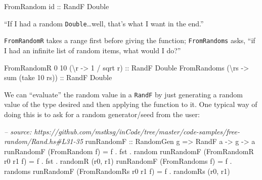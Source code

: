 \documentclass[]{article}
\newenvironment{Shaded}{}{}
\newcommand{\DataTypeTok}[1]{\textcolor[rgb]{0.56,0.13,0.00}{{#1}}}
\newcommand{\DecValTok}[1]{\textcolor[rgb]{0.25,0.63,0.44}{{#1}}}
\newcommand{\CommentTok}[1]{\textcolor[rgb]{0.38,0.63,0.69}{\textit{{#1}}}}
\newcommand{\OtherTok}[1]{\textcolor[rgb]{0.00,0.44,0.13}{{#1}}}
\newcommand{\FunctionTok}[1]{\textcolor[rgb]{0.02,0.16,0.49}{{#1}}}
\newcommand{\NormalTok}[1]{{#1}}
\begin{document}
\begin{Shaded}
\begin{Highlighting}[]
\DataTypeTok{FromRandom}\OtherTok{ id ::} \DataTypeTok{RandF} \DataTypeTok{Double}
\end{Highlighting}
\end{Shaded}

``If I had a random \texttt{Double}\ldots{}well, that's what I want in
the end.''

\texttt{FromRandomR} takes a range first before giving the function;
\texttt{FromRandoms} asks, ``if I had an infinite list of random items,
what would I do?''

\begin{Shaded}
\begin{Highlighting}[]
\DataTypeTok{FromRandomR} \DecValTok{0} \DecValTok{10} \NormalTok{(\textbackslash{}r }\OtherTok{->} \DecValTok{1} \FunctionTok{/} \NormalTok{sqrt r)}\OtherTok{ ::} \DataTypeTok{RandF} \DataTypeTok{Double}
\DataTypeTok{FromRandoms} \NormalTok{(\textbackslash{}rs }\OtherTok{->} \NormalTok{sum (take }\DecValTok{10} \NormalTok{rs))}\OtherTok{ ::} \DataTypeTok{RandF} \DataTypeTok{Double}
\end{Highlighting}
\end{Shaded}

We can ``evaluate'' the random value in a \texttt{RandF} by just
generating a random value of the type desired and then applying the
function to it. One typical way of doing this is to ask for a random
generator/seed from the user:

\begin{Shaded}
\begin{Highlighting}[]
\CommentTok{-- source: https://github.com/mstksg/inCode/tree/master/code-samples/free-random/Rand.hs#L31-35}
\OtherTok{runRandomF ::} \DataTypeTok{RandomGen} \NormalTok{g }\OtherTok{=>} \DataTypeTok{RandF} \NormalTok{a }\OtherTok{->} \NormalTok{g }\OtherTok{->} \NormalTok{a}
\NormalTok{runRandomF (}\DataTypeTok{FromRandom} \NormalTok{f)         }\FunctionTok{=} \NormalTok{f }\FunctionTok{.} \NormalTok{fst }\FunctionTok{.} \NormalTok{random}
\NormalTok{runRandomF (}\DataTypeTok{FromRandomR} \NormalTok{r0 r1 f)  }\FunctionTok{=} \NormalTok{f }\FunctionTok{.} \NormalTok{fst }\FunctionTok{.} \NormalTok{randomR (r0, r1)}
\NormalTok{runRandomF (}\DataTypeTok{FromRandoms} \NormalTok{f)        }\FunctionTok{=} \NormalTok{f }\FunctionTok{.} \NormalTok{randoms}
\NormalTok{runRandomF (}\DataTypeTok{FromRandomRs} \NormalTok{r0 r1 f) }\FunctionTok{=} \NormalTok{f }\FunctionTok{.} \NormalTok{randomRs (r0, r1)}
\end{Highlighting}
\end{Shaded}
\end{document}
